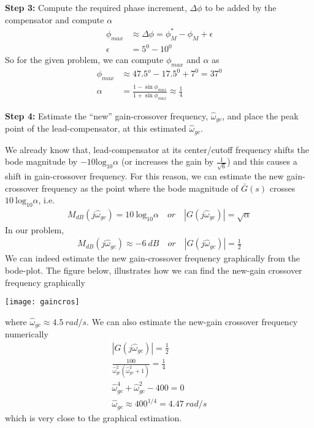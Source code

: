 \documentclass[twoside]{article}
\begin{document}
\textbf{Step 3:} Compute the required phase increment, $\Delta \phi$ to be
added by the compensator and compute $\alpha$
%
\begin{align*}
   \phi_{max} &\approx \Delta \phi = \phi_M^* - \phi_M + \epsilon
  \\
  \epsilon &= 5^0 - 10^0
\end{align*}
%
So for the given problem, we can compute $\phi_{max}$
and $\alpha$ as
%
\begin{align*}
   \phi_{max} &\approx 47.5^o - 17.5^0 + 7^0 = 37^0
                \\
  \alpha &= \frac{1 - \sin \phi_{max}}{1 + \sin \phi_{max}} \approx \frac{1}{4}
\end{align*}

\textbf{Step 4:} Estimate the ``new'' gain-crossover frequency, 
$\hat{\omega}_{gc}$, and place the peak point of the lead-compensator,
at this estimated $\hat{\omega}_{gc}$. 

We already know that, lead-compensator at its
center/cutoff frequency shifts the bode magnitude 
by $-10 \mathrm{log}_{10} \alpha$ (or increases the gain 
by $\frac{1}{\sqrt{6}}$) and this causes a shift in
gain-crossover frequency. 
For this reason, we can estimate the new gain-crossover
frequency as the point where the bode magnitude of 
$\bar{G}(s)$ crosses $10 \ \mathrm{log}_{10} \alpha$,
i.e. 
%
\begin{align*}
  M_{dB}( j \hat{\omega}_{gc} ) = 10 \ \mathrm{log}_{10} \alpha
\quad or \quad
  |G(j \hat{\omega}_{gc})| = \sqrt{\alpha}
\end{align*}
%
In our problem, 
%
\begin{align*}
  M_{dB}( j \hat{\omega}_{gc} ) \approx -6 \ dB
\quad or \quad
  |G(j \hat{\omega}_{gc})| = \frac{1}{2}
\end{align*}
%
We can indeed estimate the new gain-crossover frequency graphically from the
bode-plot. The figure below, illustrates how we can find 
the new-gain crossover frequency graphically

     \begin{center}
 \begin{minipage}[h]{\linewidth}
     \begin{center}
       \texttt{[image: gaincros]}
     \end{center}
 \end{minipage}
     \end{center}

where $\hat{\omega}_{gc} \approx 4.5 \ rad/s$.
We can also estimate the new-gain crossover frequency
numerically 
%
\begin{align*}
  |G(j \hat{\omega}_{gc})| = \frac{1}{2}
  \\
  \frac{100}{\hat{\omega}_{gc}^2 \left( \hat{\omega}_{gc}^2 + 1
  \right)} = \frac{1}{4}
  \\
  \hat{\omega}_{gc}^4 + \hat{\omega}_{gc}^2 - 400 = 0
  \\
   \hat{\omega}_{gc} \approx 400^{1/4} = 4.47 \ rad/s
\end{align*}
%
which is very close to the graphical estimation. 
\end{document}
